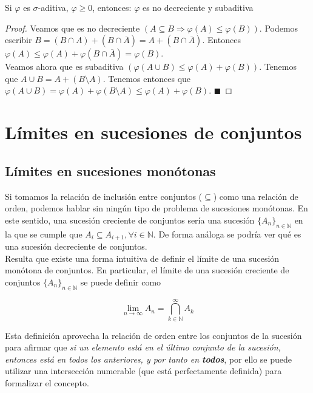 \documentclass[12pt,a4paper]{book}
\newcommand*{\qed}{\hfill\ensuremath{\blacksquare}}
\begin{document}
\begin{theorem} 
Si $\varphi$ es $\sigma$-aditiva, $\varphi \geq 0$, entonces: $\varphi$ es no decreciente y subaditiva
\end{theorem}

\begin{proof}
Veamos que es no decreciente $(A \subseteq B \Rightarrow \varphi (A) \leq \varphi (B))$. Podemos escribir $B = (B \cap A) + (B \cap \overline{A}) = A + (B \cap \overline{A})$. Entonces $\varphi (A) \leq \varphi (A) + \varphi (B \cap \overline{A}) = \varphi (B)$.\\

Veamos ahora que es subaditiva $(\varphi(A \cup B) \leq \varphi(A) + \varphi(B))$. Tenemos que $ A \cup B = A + (B \setminus A)$. Tenemos entonces que $\varphi (A \cup B) = \varphi (A) + \varphi (B \setminus A) \leq \varphi (A) + \varphi (B)$.
\qed
\end{proof}

\section{Límites en sucesiones de conjuntos}

\subsection{Límites en sucesiones monótonas}

Si tomamos la relación de inclusión entre conjuntos ($\subseteq$) como una relación de orden, podemos hablar sin ningún tipo de problema de sucesiones monótonas. En este sentido, una sucesión creciente de conjuntos sería una sucesión $\{A_n\}_{n \in \mathbb{N}}$ en la que se cumple que $A_i \subseteq A_{i+1}, \forall i \in \mathbb{N}$. De forma análoga se podría ver qué es una sucesión decreciente de conjuntos.\\

Resulta que existe una forma intuitiva de definir el límite de una sucesión monótona de conjuntos. En particular, el límite de una sucesión creciente de conjuntos $\{A_n\}_{n \in \mathbb{N} }$ se puede definir como 

$$\lim_{n\to\infty} A_n = \bigcap_{k \in \mathbb{N}}^{\infty} A_k$$

Esta definición aprovecha la relación de orden entre los conjuntos de la sucesión para afirmar que \textit{si un elemento está en el último conjunto de la sucesión, entonces está en todos los anteriores, y por tanto en \textbf{todos}}, por ello se puede utilizar una intersección numerable (que está perfectamente definida) para formalizar el concepto.\\
\end{document}
